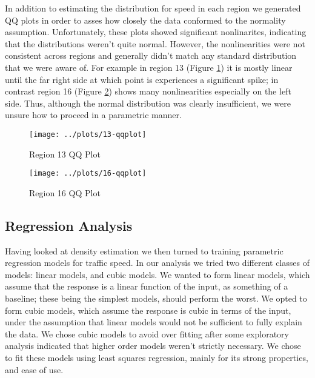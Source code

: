 \documentclass[12pt]{article}
\begin{document}
In addition to estimating the distribution for speed in each region we generated QQ plots in order to asses how closely the data conformed to the normality assumption. Unfortunately, these plots showed significant nonlinarites, indicating that the distributions weren't quite normal. However, the nonlinearities were not consistent across regions and generally didn't match any standard distribution that we were aware of. For example in region 13 (Figure \ref{region13qq}) it is mostly linear until the far right side at which point is experiences a significant spike; in contrast region 16 (Figure \ref{region16qq}) shows many nonlinearities especially on the left side. Thus, although the normal distribution was clearly insufficient, we were unsure how to proceed in a parametric manner.
\begin{figure}[!ht]
\centering
\texttt{[image: ../plots/13-qqplot]}
\caption{Region 13 QQ Plot}
\label{region13qq}
\end{figure}
\begin{figure}[!ht]
\centering
\texttt{[image: ../plots/16-qqplot]}
\caption{Region 16 QQ Plot}
\label{region16qq}
\end{figure}
\subsection{Regression Analysis}
Having looked at density estimation we then turned to training parametric regression models for traffic speed. In our analysis we tried two different classes of models: linear models, and cubic models. We wanted to form linear models, which assume that the response is a linear function of the input, as something of a baseline; these being the simplest models, should perform the worst. We opted to form cubic models, which assume the response is cubic in terms of the input, under the assumption that linear models would not be sufficient to fully explain the data. We chose cubic models to avoid over fitting after some exploratory analysis indicated that higher order models weren't strictly necessary. We chose to fit these models using least squares regression, mainly for its strong properties, and ease of use.
\end{document}
